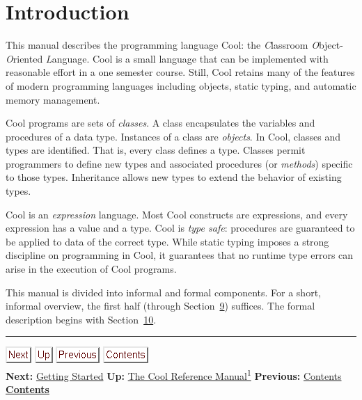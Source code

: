 \documentclass[]{article}
\begin{document}
\section{Introduction}

This manual describes the programming language Cool: the
\emph{C}lassroom \emph{O}bject-\emph{O}riented \emph{L}anguage. Cool is
a small language that can be implemented with reasonable effort in a one
semester course. Still, Cool retains many of the features of modern
programming languages including objects, static typing, and automatic
memory management.

Cool programs are sets of \emph{classes}. A class encapsulates the
variables and procedures of a data type. Instances of a class are
\emph{objects}. In Cool, classes and types are identified. That is,
every class defines a type. Classes permit programmers to define new
types and associated procedures (or \emph{methods}) specific to those
types. Inheritance allows new types to extend the behavior of existing
types.

Cool is an \emph{expression} language. Most Cool constructs are
expressions, and every expression has a value and a type. Cool is
\emph{type safe}: procedures are guaranteed to be applied to data of the
correct type. While static typing imposes a strong discipline on
programming in Cool, it guarantees that no runtime type errors can arise
in the execution of Cool programs.

This manual is divided into informal and formal components. For a short,
informal overview, the first half (through
Section~\href{node32.html\#sec-main}{9}) suffices. The formal
description begins with Section~\href{node33.html\#lex-struct}{10}.

\begin{center}\rule{3in}{0.4pt}\end{center}

\href{node3.html}{\includegraphics{next.png}}
\href{cool-manual.html}{\includegraphics{up.png}}
\href{node1.html}{\includegraphics{prev.png}}
\href{node1.html}{\includegraphics{contents.png}} \\ \textbf{Next:}
\href{node3.html}{Getting Started} \textbf{Up:}
\href{cool-manual.html}{The Cool Reference Manual\textsuperscript{1}}
\textbf{Previous:} \href{node1.html}{Contents} ~
\textbf{\href{node1.html}{Contents}}
\end{document}
